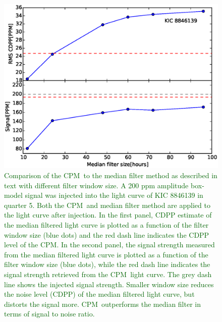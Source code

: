 \documentclass[12pt, preprint]{aastex}
\newcommand{\name}{CPM}
\newcommand{\revise}[1]{\textcolor{darkgreen}{#1}}
\begin{document}
\begin{figure}[p]
\begin{center}
\includegraphics[width=\textwidth]{f7a}
\end{center}
\caption{
  \label{filter} 
\revise{Comparison of the \name\ to the median filter method as described in text with different filter window size. A 200 ppm amplitude box-model signal was injected into the light curve of KIC 8846139 in quarter 5. Both the \name\ and median filter method are applied to the light curve after injection. In the first panel, CDPP estimate of the median filtered light curve is plotted as a function of the filter window size (blue dots) and the red dash line indicates the CDPP level of the \name. In the second panel, the signal strength measured from the median filtered light curve is plotted as a function of the filter window size (blue dots), while the red dash line indicates the signal strength retrieved from the \name\ light curve. The grey dash line shows the injected signal strength. Smaller window size reduces the noise level (CDPP) of the median filtered light curve, but distorts the signal more. \name\ outperforms the median filter in terms of signal to noise ratio.}
}
\end{figure}
\end{document}
